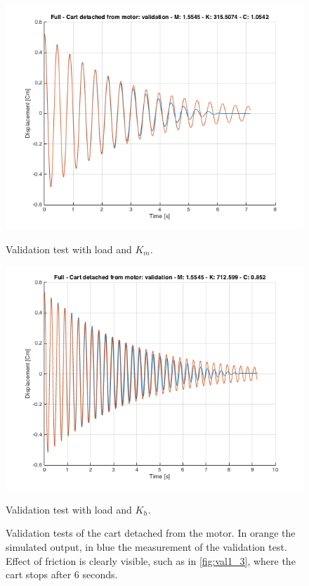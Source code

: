 \begin{figure} [!h]
\vspace*{0.5cm} %
\begin{minipage}[t]{0.4\textwidth}
\includegraphics[width=\linewidth]{img/validation_ml_km_full.png}
\caption{Validation test with  load and $K_m$.}
\label{fig:val1_3}
\end{minipage}
\hspace{\fill}
\begin{minipage}[t]{0.4\textwidth}
\includegraphics[width=\linewidth]{img/validation_ml_kh_full.png}
\caption{Validation test with  load and $K_h$.}
\label{fig:val1_4}
\end{minipage}
\caption{Validation tests of the cart detached from the motor. In orange the simulated output, in blue the measurement of the validation test. Effect of friction is clearly visible, such as in \ref{fig:val1_3}, where the cart stops after $6$ seconds.}
\label{fig:val1}
\end{figure}

